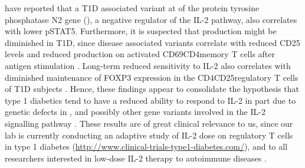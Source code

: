 \citet{Long:2011hk} have reported that a \Gls{T1D} associated variant at 
of the protein tyrosine phosphatase N2 gene (),
a negative regulator of the IL-2 pathway,
also correlates with lower pSTAT5.
Furthermore, it is suspected that  production might be diminished in T1D, since disease associated  variants correlate with reduced CD25 levels and reduced  production on activated CD69\positive CD4\positive memory T cells after antigen stimulation \citep{Dendrou:2009dv}.
Long-term reduced sensitivity to IL-2 also correlates with diminished maintenance of FOXP3 expression in the CD4\positive CD25\positive regulatory T cells of \gls{T1D} subjects \citep{Long:2010ej}.
Hence, these findings appear to consolidate the hypothesis that type 1 diabetics tend to have a reduced ability to respond to IL-2
in part due to genetic defects in ,  and possibly other gene variants involved in the IL-2 signalling pathway
\citep{Long:2010ej,Long:2011hk,Long:2012ea}.
These results are of great clinical relevance to us,
since our lab is currently conducting an
adaptive study of IL-2 dose on regulatory T cells in type 1 diabetes (\url{http://www.clinical-trials-type1-diabetes.com/}),
and to all researchers interested in low-dose IL-2 therapy to autoimmune diseases \citep{Koreth:2011kv,Saadoun:2011em}.

